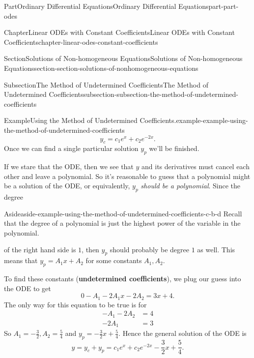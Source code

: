 \documentclass[twoside,10pt,]{book}
\newcommand{\terminology}[1]{\textbf{#1}}
\numberwithin{equation}{part}
\begin{document}
\begin{partptx}{Part}{Ordinary Differential Equations}{}{Ordinary Differential Equations}{}{}{part-part-odes}
\begin{chapterptx}{Chapter}{Linear ODEs with Constant Coefficients}{}{Linear ODEs with Constant Coefficients}{}{}{chapter-linear-odes-constant-coefficients}
\begin{sectionptx}{Section}{Solutions of Non-homogeneous Equations}{}{Solutions of Non-homogeneous Equations}{}{}{section-section-solutions-of-nonhomogeneous-equations}
\begin{subsectionptx}{Subsection}{The Method of Undetermined Coefficients}{}{The Method of Undetermined Coefficients}{}{}{subsection-subsection-the-method-of-undetermined-coefficients}
\begin{example}{Example}{Using the Method of Undetermined Coefficients.}{example-example-using-the-method-of-undetermined-coefficients}
\begin{equation*}
y_{c} = c_{1}e^{x} + c_{2}e^{-2x}.
\end{equation*}
Once we can find a single particular solution \(y_{p}\) we'll be finished.%
\par
If we stare that the ODE, then we see that \(y\) and its derivatives must cancel each other and leave a polynomial. So it's reasonable to guess that a polynomial might be a solution of the ODE, or equivalently, \(y_{p}\) \emph{should be a polynomial}. Since the degree\begin{aside}{Aside}{}{aside-example-using-the-method-of-undetermined-coefficients-c-b-d}%
Recall that the degree of a polynomial is just the highest power of the variable in the polynomial.%
\end{aside}
 of the right hand side is \(1\), then \(y_{p}\) should probably be degree \(1\) as well. This means that \(y_{p} = A_{1}x + A_{2}\) for some constants \(A_{1},A_{2}\).%
\par
To find these constants (\terminology{undetermined coefficients}), we plug our guess into the ODE to get%
\begin{equation*}
0 - A_{1} - 2A_{1}x - 2A_{2} = 3x + 4.
\end{equation*}
The only way for this equation to be true is for%
\begin{align*}
-A_{1} - 2A_{2} & = 4 \\
-2A_{1} & = 3
\end{align*}
So \(A_{1} = -\frac{3}{2}, A_{2} = \frac{5}{4}\) and \(y_{p} = -\frac{3}{2}x + \frac{5}{4}\). Hence the general solution of the ODE is%
\begin{equation*}
y = y_{c} + y_{p} = c_{1}e^{x} + c_{2}e^{-2x} - \frac{3}{2}x + \frac{5}{4}.
\end{equation*}
%
\end{example}

\end{subsectionptx}
\end{sectionptx}
\end{chapterptx}
\end{partptx}
\end{document}
